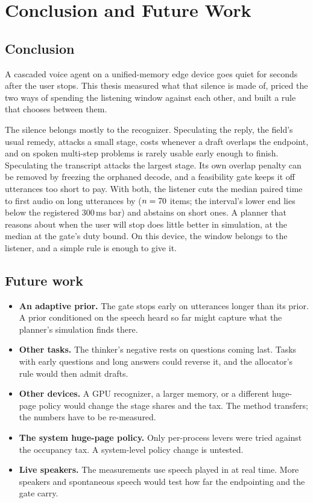 \chapter{Conclusion and Future Work}
\label{ch:conclusion}

\section{Conclusion}

A cascaded voice agent on a unified-memory edge device goes quiet for
seconds after the user stops. This thesis measured what that silence is made
of, priced the two ways of spending the listening window against each other,
and built a rule that chooses between them.

The silence belongs mostly to the recognizer. Speculating the reply, the
field's usual remedy, attacks a small stage, costs \ThinkerOverlap{} whenever
a draft overlaps the endpoint, and on spoken multi-step problems is rarely
usable early enough to finish. Speculating the transcript attacks the largest
stage. Its own overlap penalty can be removed by freezing the orphaned
decode, and a feasibility gate keeps it off utterances too short to pay. With
both, the listener cuts the median paired time to first audio on long
utterances by \PthreeRed{} ($n=70$ items; the interval's lower end lies
below the registered 300\,ms bar) and abstains on short ones.
A planner that reasons about when the user will stop does little better in
simulation, \PlannerDP{} at the median at the gate's duty bound. On this device, the window belongs to
the listener, and a simple rule is enough to give it.

\section{Future work}

\begin{itemize}
\item \textbf{An adaptive prior.} The gate stops early on utterances longer
  than its prior. A prior conditioned on the speech heard so far might
  capture what the planner's simulation finds there.
\item \textbf{Other tasks.} The thinker's negative rests on questions coming
  last. Tasks with early questions and long answers could reverse it, and the
  allocator's rule would then admit drafts.
\item \textbf{Other devices.} A GPU recognizer, a larger memory, or a
  different huge-page policy would change the stage shares and the tax. The
  method transfers; the numbers have to be re-measured.
\item \textbf{The system huge-page policy.} Only per-process levers were tried
  against the occupancy tax. A system-level policy change is untested.
\item \textbf{Live speakers.} The measurements use speech played in at real
  time. More speakers and spontaneous speech would test how far the
  endpointing and the gate carry.
\end{itemize}

